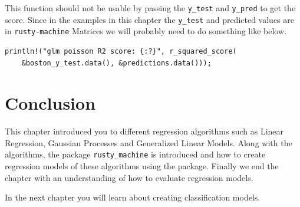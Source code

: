 \documentclass{book}
\begin{document}
This function should not be usable by passing the \lstinline{y_test} and \lstinline{y_pred} to get the score. Since in the examples in this chapter the \lstinline{y_test} and predicted values are in \lstinline{rusty-machine} Matrices we will probably need to do something like below.

\begin{lstlisting}[caption={chapter2\\/rustlymachine\_regression/src\\/glms\\.rs}]
println!("glm poisson R2 score: {:?}", r_squared_score(
    &boston_y_test.data(), &predictions.data()));
\end{lstlisting}
\label{sub:r_squared_error}



\label{sub:evaluation_of_rusty_machine_models}


\section{Conclusion}
This chapter introduced you to different regression algorithms such as Linear Regression, Gaussian Processes and Generalized Linear Models. Along with the algorithms, the package \lstinline{rusty_machine}  is introduced and how to create regression models of these algorithms using the package. Finally we end the chapter with an understanding of how to evaluate regression models.

In the next chapter you will learn about creating classification models.

\printbibliography
\end{document}
